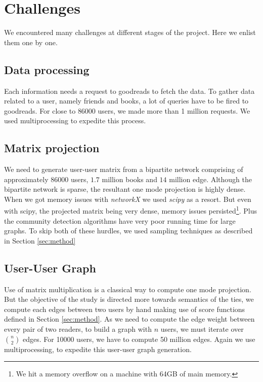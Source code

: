 \documentclass[11pt]{article}
\begin{document}
\section{Challenges}
We encountered many challenges at different stages of the project. Here we enlist them one by one.

\subsection{Data processing}
Each information needs a request to goodreads to fetch the data. To gather data related to a user, namely friends and books, a lot of queries have to be fired to goodreads. For close to $86000$ users, we made more than 1 million requests. We used multiprocessing to expedite this process.

\subsection{Matrix projection}
We need to generate user-user matrix from a bipartite network comprising of approximately $86000$ users, $1.7$ million books and $14$ million edge. Although the bipartite network is sparse, the resultant one mode projection is highly dense. When we got memory issues with {\it networkX} we used {\it scipy} as a resort. But even with scipy, the projected matrix being very dense, memory issues persisted\footnote{ We hit a memory overflow on a machine with 64GB of main memory.}. Plus the community detection algorithms have very poor running time for large graphs. To skip both of these hurdles, we used sampling techniques as described in Section \ref{sec:method}

\subsection{User-User Graph}
Use of matrix multiplication is a classical way to compute one mode projection. But the objective of the study is directed more towards semantics of the ties, we compute each edges between two users by hand making use of score functions defined in Section \ref{sec:method}. As we need to compute the edge weight between every pair of two readers, to build a graph with $n$ users, we must iterate over $n \choose 2$ edges. For 10000 users, we have to compute 50 million edges. Again we use multiprocessing, to expedite this user-user graph generation.
\end{document}
